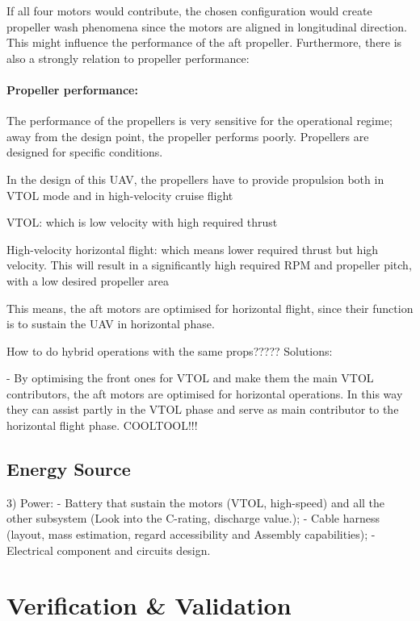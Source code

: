 If all four motors would contribute, the chosen configuration would create propeller wash phenomena since the motors are aligned in longitudinal direction. This might influence the performance of the aft propeller. Furthermore, there is also a strongly relation to propeller performance: \\

\paragraph{Propeller performance:}
The performance of the propellers is very sensitive for the operational regime; away from the design point, the propeller performs poorly. Propellers are designed for specific conditions. 

In the design of this UAV, the propellers have to provide propulsion both in VTOL mode and in high-velocity cruise flight

VTOL: which is low velocity with high required thrust

High-velocity horizontal flight: which means lower required thrust but high velocity. This will result in a significantly high required RPM and propeller pitch, with a low desired propeller area



This means, the aft motors are optimised for horizontal flight, since their function is to sustain the UAV in horizontal phase.

How to do hybrid operations with the same props????? Solutions:

- By optimising the front ones for VTOL and make them the main VTOL contributors, the aft motors are optimised for horizontal operations. In this way they can assist partly in the VTOL phase and serve as main contributor to the horizontal flight phase. 
COOLTOOL!!! 



\subsection{Energy Source}

3) Power:
- Battery that sustain the motors (VTOL, high-speed) and all the other subsystem (Look into the C-rating, discharge value.);
- Cable harness (layout, mass estimation, regard accessibility and Assembly capabilities);
- Electrical component and circuits design.

\section{Verification \& Validation}
\label{sec:VNVPNP}

